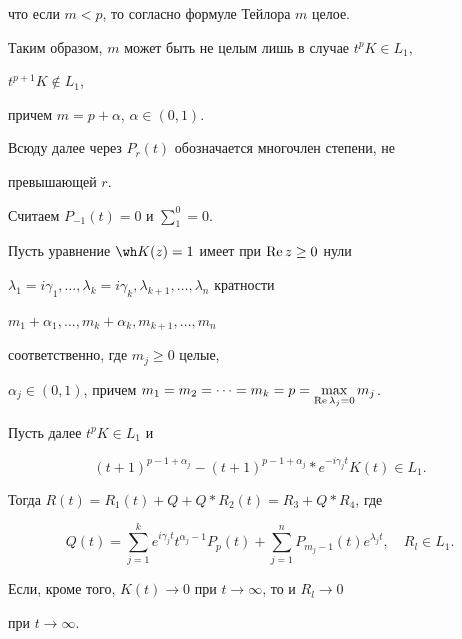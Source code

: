 что если $m<p$, то согласно формуле Тейлора $m$ целое. 


Таким образом, $m$ может быть не целым лишь в случае $t^p K\in L_1$, 


$t^{p+1}K\notin L_1$, 


причем $m=p+\alpha$, $\alpha\in(0,1)$. 


 


Всюду далее через $P_r(t)$ обозначается многочлен степени, не 


превышающей $r$. 


Считаем $P_{-1}(t)=0$ и $\sum\limits^0_1=0$. 


 


\begin{thmnonum} 


Пусть уравнение $\wh K(z)=1$ имеет при $\operatorname{Re} z\ge0$ нули 


$\lambda_1=i\gamma_1,\dotsc,\lambda_k=i\gamma_k,\lambda_{k+1},\dotsc, 


\lambda_n$ кратности 


$m_1+\alpha_1,\dotsc,m_k+\alpha_k,m_{k+1},\dotsc,m_n$ 


соответственно, где $m_j\ge0$ целые, 


$\alpha_j\in(0,1)$, причем $m_1=m_2=\dotsb=m_k=p= 


\max\limits_{\re\lambda_j=0}m_j$. 


Пусть далее $t^p K\in L_1$ и 


\begin{equation} 


(t+1)^{p-1+\alpha_j}-(t+1)^{p-1+\alpha_j}* 


e^{-i\gamma_j t}K(t)\in L_1. 


\end{equation} 


Тогда $R(t)=R_1(t)+Q+Q*R_2(t)=R_3+Q*R_4$, где 


$$ 


Q(t)=\sum^k_{j=1}e^{i\gamma_j t}t^{\alpha_j-1}P_p(t)+ 


\sum^n_{j=1}P_{m_j-1}(t)e^{\lambda_j t},\quad R_l\in L_1. 


$$ 


Если, кроме того, $K(t)\to0$ при $t\to\infty$, то и $R_l\to0$ 


при $t\to\infty$. 


\end{thmnonum} 


